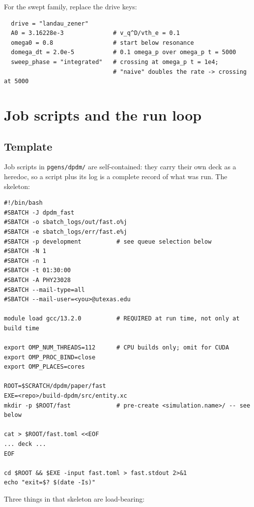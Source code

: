\documentclass[11pt,a4paper]{article}
\newcommand{\code}[1]{\texttt{\small #1}}
\begin{document}
\noindent For the swept family, replace the drive keys:
\begin{lstlisting}
  drive = "landau_zener"
  A0 = 3.16228e-3              # v_q^D/vth_e = 0.1
  omega0 = 0.8                 # start below resonance
  domega_dt = 2.0e-5           # 0.1 omega_p over omega_p t = 5000
  sweep_phase = "integrated"   # crossing at omega_p t = 1e4;
                               # "naive" doubles the rate -> crossing at 5000
\end{lstlisting}

\section{Job scripts and the run loop}
\label{sec:jobs}

\subsection{Template}

Job scripts in \code{pgens/dpdm/} are self-contained: they carry their own deck as a
heredoc, so a script plus its log is a complete record of what was run. The skeleton:

\begin{lstlisting}
#!/bin/bash
#SBATCH -J dpdm_fast
#SBATCH -o sbatch_logs/out/fast.o%j
#SBATCH -e sbatch_logs/err/fast.e%j
#SBATCH -p development          # see queue selection below
#SBATCH -N 1
#SBATCH -n 1
#SBATCH -t 01:30:00
#SBATCH -A PHY23028
#SBATCH --mail-type=all
#SBATCH --mail-user=<you>@utexas.edu

module load gcc/13.2.0          # REQUIRED at run time, not only at build time

export OMP_NUM_THREADS=112      # CPU builds only; omit for CUDA
export OMP_PROC_BIND=close
export OMP_PLACES=cores

ROOT=$SCRATCH/dpdm/paper/fast
EXE=<repo>/build-dpdm/src/entity.xc
mkdir -p $ROOT/fast             # pre-create <simulation.name>/ -- see below

cat > $ROOT/fast.toml <<EOF
... deck ...
EOF

cd $ROOT && $EXE -input fast.toml > fast.stdout 2>&1
echo "exit=$? $(date -Is)"
\end{lstlisting}

Three things in that skeleton are load-bearing:
\end{document}
